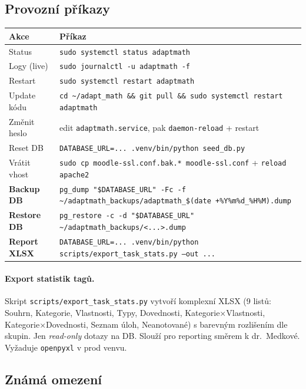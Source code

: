 \documentclass[11pt,a4paper]{article}
\begin{document}
\subsection{Provozní příkazy}

\begin{tabular}{ll}
  \toprule
  \textbf{Akce} & \textbf{Příkaz} \\
  \midrule
  Status              & \texttt{sudo systemctl status adaptmath} \\
  Logy (live)         & \texttt{sudo journalctl -u adaptmath -f} \\
  Restart             & \texttt{sudo systemctl restart adaptmath} \\
  Update kódu         & \texttt{cd \textasciitilde/adapt\_math \&\& git pull \&\& sudo systemctl restart adaptmath} \\
  Změnit heslo        & edit \texttt{adaptmath.service}, pak \texttt{daemon-reload} + restart \\
  Reset DB            & \texttt{DATABASE\_URL=... .venv/bin/python seed\_db.py} \\
  Vrátit vhost        & \texttt{sudo cp moodle-ssl.conf.bak.* moodle-ssl.conf} + \texttt{reload apache2} \\
  \textbf{Backup DB}  & \texttt{pg\_dump "\$DATABASE\_URL" -Fc -f \textasciitilde/adaptmath\_backups/adaptmath\_\$(date +\%Y\%m\%d\_\%H\%M).dump} \\
  \textbf{Restore DB} & \texttt{pg\_restore -c -d "\$DATABASE\_URL" \textasciitilde/adaptmath\_backups/<...>.dump} \\
  \textbf{Report XLSX} & \texttt{DATABASE\_URL=... .venv/bin/python scripts/export\_task\_stats.py --out ...} \\
  \bottomrule
\end{tabular}

\paragraph{Export statistik tagů.} Skript \texttt{scripts/export\_task\_stats.py} vytvoří komplexní XLSX (9 listů: Souhrn, Kategorie, Vlastnosti, Typy, Dovednosti, Kategorie×Vlastnosti, Kategorie×Dovednosti, Seznam úloh, Neanotované) s barevným rozlišením dle skupin. Jen \emph{read-only} dotazy na DB. Slouží pro reporting směrem k dr.~Medkové. Vyžaduje \texttt{openpyxl} v prod venvu.

\subsection{Známá omezení}
\end{document}
